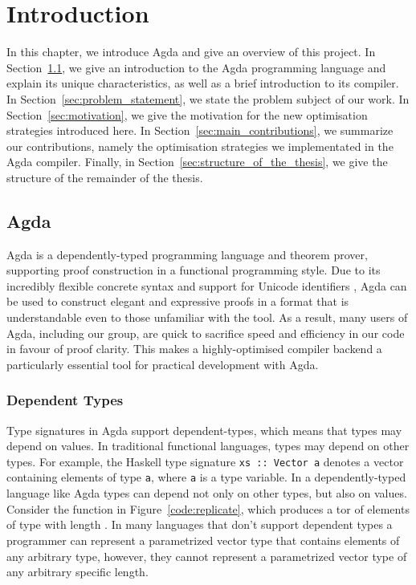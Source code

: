 \chapter{Introduction}
\label{cha:introduction}

In this chapter, we introduce Agda and give an overview of this project. In Section~\ref{sec:intro_agda}, we give an introduction to the Agda programming language and explain its unique characteristics, as well as a brief introduction to its compiler. In Section~\ref{sec:problem_statement}, we state the problem subject of our work. In Section~\ref{sec:motivation}, we give the motivation for the new optimisation strategies introduced here. In Section~\ref{sec:main_contributions}, we summarize our contributions, namely the optimisation strategies we implementated in the Agda compiler. Finally, in Section~\ref{sec:structure_of_the_thesis}, we give the structure of the remainder of the thesis.

\section{Agda}
\label{sec:intro_agda}

Agda \cite{norell2007} is a dependently-typed programming language and theorem prover, supporting proof construction in a functional programming style. Due to its incredibly flexible concrete syntax and support for Unicode identifiers \cite{bove2009}, Agda can be used to construct elegant and expressive proofs in a format that is understandable even to those unfamiliar with the tool. As a result, many users of Agda, including our group, are quick to sacrifice speed and efficiency in our code in favour of proof clarity. This makes a highly-optimised compiler backend a particularly essential tool for practical development with Agda.

\subsection{Dependent Types}

Type signatures in Agda support dependent-types, which means that types may depend on values. In traditional functional languages, types may depend on other types. For example, the Haskell type signature \lstinline{xs :: Vector a} denotes a vector containing elements of type \lstinline{a}, where \lstinline{a} is a type variable. In a dependently-typed language like Agda types can depend not only on other types, but also on values. Consider the  function in Figure~\ref{code:replicate}, which produces a tor of elements of type  with length .\cite{norell2009} In many languages that don't support dependent types a programmer can represent a parametrized vector type that contains elements of any arbitrary type, however, they cannot represent a parametrized vector type of any arbitrary specific length.

